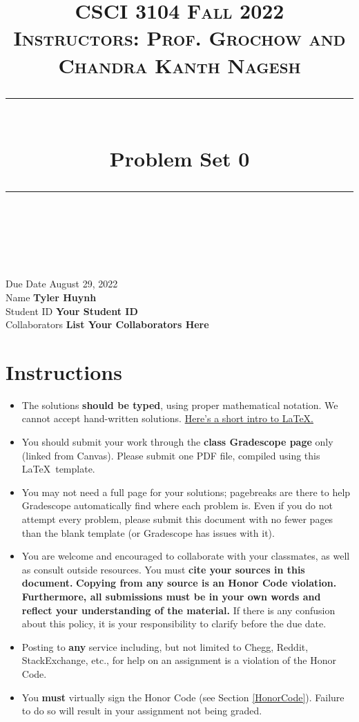 \documentclass[11pt]{article}
\title{
\normalfont \normalsize 
\textsc{CSCI 3104 Fall 2022 \\ 
Instructors: Prof. Grochow and Chandra Kanth Nagesh} \\
[10pt] 
\rule{\linewidth}{0.5pt} \\[6pt] 
\huge Problem Set 0 \\
\rule{\linewidth}{2pt}  \\[10pt]
}
\date{}
\theoremstyle{definition}
\theoremstyle{definition}
\theoremstyle{definition}
\begin{document}
\maketitle


\noindent
Due Date \dotfill August 29, 2022 \\
Name \dotfill \textbf{Tyler Huynh} \\
Student ID \dotfill \textbf{Your Student ID} \\
Collaborators \dotfill \textbf{List Your Collaborators Here}

\tableofcontents

\section{Instructions}
 \begin{itemize}
	\item The solutions \textbf{should be typed}, using proper mathematical notation. We cannot accept hand-written solutions. \href{http://ece.uprm.edu/~caceros/latex/introduction.pdf}{Here's a short intro to \LaTeX.}
	\item You should submit your work through the \textbf{class Gradescope page} only (linked from Canvas). Please submit one PDF file, compiled using this \LaTeX \ template.
	\item You may not need a full page for your solutions; pagebreaks are there to help Gradescope automatically find where each problem is. Even if you do not attempt every problem, please submit this document with no fewer pages than the blank template (or Gradescope has issues with it).

	\item You are welcome and encouraged to collaborate with your classmates, as well as consult outside resources. You must \textbf{cite your sources in this document.} \textbf{Copying from any source is an Honor Code violation. Furthermore, all submissions must be in your own words and reflect your understanding of the material.} If there is any confusion about this policy, it is your responsibility to clarify before the due date. 

	\item Posting to \textbf{any} service including, but not limited to Chegg, Reddit, StackExchange, etc., for help on an assignment is a violation of the Honor Code.

	\item You \textbf{must} virtually sign the Honor Code (see Section \ref{HonorCode}). Failure to do so will result in your assignment not being graded.
\end{itemize}
\end{document}
